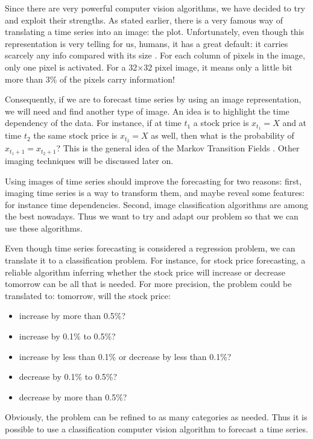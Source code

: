 \documentclass[11pt]{article}
\begin{document}
\begin{onehalfspace}
Since there are very powerful computer vision algorithms, we have decided to try and exploit their strengths. As stated earlier, there is a very famous way of translating a time series into an image: the plot. Unfortunately, even though this representation is very telling for us, humans, it has a great default: it carries scarcely any info compared with its size \cite{jastrebska}. For each column of pixels in the image, only one pixel is activated. For a 32$\times$32 pixel image, it means only a little bit more than 3\% of the pixels carry information!

Consequently, if we are to forecast time series by using an image representation, we will need and find another type of image. An idea is to highlight the time dependency of the data. For instance, if at time $t_1$ a stock price is $x_{t_1} = X$ and at time $t_2$ the same stock price is $x_{t_2} = X$ as well, then what is the probability of $x_{t_1 + 1} = x_{t_2 + 1}$? This is the general idea of the Markov Transition Fields \cite{wang}. Other imaging techniques will be discussed later on.

Using images of time series should improve the forecasting for two reasons: first, imaging time series is a way to transform them, and maybe reveal some features: for instance time dependencies. Second, image classification algorithms are among the best nowadays. Thus we want to try and adapt our problem so that we can use these algorithms.

Even though time series forecasting is considered a regression problem, we can translate it to a classification problem. For instance, for stock price forecasting, a reliable algorithm inferring whether the stock price will increase or decrease tomorrow can be all that is needed. For more precision, the problem could be translated to: tomorrow, will the stock price:
\begin{itemize}
    \item increase by more than 0.5\%?
    \item increase by 0.1\% to 0.5\%?
    \item increase by less than 0.1\% or decrease by less than 0.1\%?
    \item decrease by 0.1\% to 0.5\%?
    \item decrease by more than 0.5\%?
\end{itemize}

Obviously, the problem can be refined to as many categories as needed. Thus it is possible to use a classification computer vision algorithm to forecast a time series. 


\end{onehalfspace}
\end{document}
